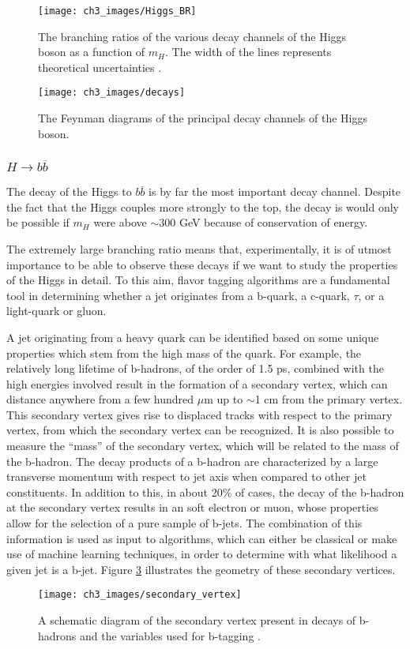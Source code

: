 \documentclass[10pt,a4paper]{book}
\begin{document}
\begin{figure}
\centering
\texttt{[image: ch3\_images/Higgs\_BR]}
\caption{The branching ratios of the various decay channels of the Higgs boson as a function of $m_H$. The width of the lines represents theoretical uncertainties \cite{LHCHiggsCrossSectionWorkingGroup:2013rie}.}
\label{Higgs branching ratios}
\end{figure}

\begin{figure}
\centering
\texttt{[image: ch3\_images/decays]}
\caption{The Feynman diagrams of the principal decay channels of the Higgs boson.}
\label{decays}
\end{figure}

\subsubsection{$H\rightarrow b\overline{b}$}

The decay of the Higgs to $b\overline{b}$ is by far the most important decay channel. Despite the fact that the Higgs couples more strongly to the top, the decay is would only be possible if $m_H$ were above $\sim300$ GeV because of conservation of energy. 

The extremely large branching ratio means that, experimentally, it is of utmost importance to be able to observe these decays if we want to study the properties of the Higgs in detail. To this aim, flavor tagging algorithms are a fundamental tool in determining whether a jet originates from a b-quark, a c-quark, $\tau$, or a light-quark or gluon. 

A jet originating from a heavy quark can be identified based on some unique properties which stem from the high mass of the quark. For example, the relatively long lifetime of b-hadrons, of the order of 1.5 ps, combined with the high energies involved result in the formation of a secondary vertex, which can distance anywhere from a few hundred $\mu$m up to $\sim$1 cm from the primary vertex. This secondary vertex gives rise to displaced tracks with respect to the primary vertex, from which the secondary vertex can be recognized. It is also possible to measure the ``mass'' of the secondary vertex, which will be related to the mass of the b-hadron. The decay products of a b-hadron are characterized by a large transverse momentum with respect to jet axis when compared to other jet constituents. In addition to this, in about 20\% of cases, the decay of the b-hadron at the secondary vertex results in an soft electron or muon, whose properties allow for the selection of a pure sample of b-jets. The combination of this information is used as input to algorithms, which can either be classical or make use of machine learning techniques, in order to determine with what likelihood a given jet is a b-jet. Figure \ref{secondary vertex} illustrates the geometry of these secondary vertices.
\begin{figure}
\centering
\texttt{[image: ch3\_images/secondary\_vertex]}
\caption{A schematic diagram of the secondary vertex present in decays of b-hadrons and the variables used for b-tagging \cite{CMS:2017wtu}.}
\label{secondary vertex}
\end{figure}
\end{document}
